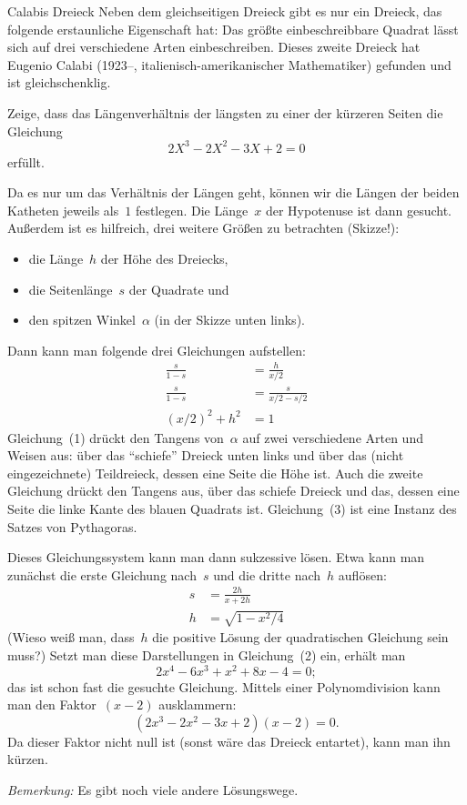 \documentclass{algblatt}
\begin{document}
\begin{aufgabe}{Calabis Dreieck}
Neben dem gleichseitigen Dreieck gibt es nur ein Dreieck, das folgende erstaunliche
Eigenschaft hat: Das größte 
einbeschreibbare Quadrat lässt sich auf drei verschiedene Arten einbeschreiben.
Dieses zweite Dreieck hat Eugenio Calabi (1923--, italienisch-amerikanischer
Mathematiker) gefunden und ist gleichschenklig.

Zeige, dass das Längenverhältnis der längsten zu einer der kürzeren Seiten die
Gleichung
\[ 2 X^3 - 2 X^2 - 3 X + 2 = 0 \]
erfüllt. \ifloesungen\else\\[1em]\fi

\begin{center}
  \scalebox{0.5}{}
\end{center}

\begin{loesung}\addtolength{\jot}{0.3em}%
Da es nur um das Verhältnis der Längen geht, können wir die Längen der
beiden Katheten jeweils als~$1$ festlegen. Die Länge~$x$ der Hypotenuse ist
dann gesucht. Außerdem ist es hilfreich, drei weitere Größen zu betrachten
(Skizze!):
\begin{itemize}
\item die Länge~$h$ der Höhe des Dreiecks,
\item die Seitenlänge~$s$ der Quadrate und
\item den spitzen Winkel~$\alpha$ (in der Skizze unten links).
\end{itemize}
Dann kann man folgende drei Gleichungen aufstellen:
\begin{align}
  \frac{s}{1 - s} &= \frac{h}{x/2} \\
  \frac{s}{1 - s} &= \frac{s}{x/2 - s/2} \\
  (x/2)^2 + h^2 &= 1
\end{align}
Gleichung~(1) drückt den Tangens von~$\alpha$ auf zwei verschiedene Arten und
Weisen aus: über das "`schiefe"' Dreieck unten links und über das (nicht
eingezeichnete) Teildreieck, dessen eine Seite die Höhe ist. Auch die zweite
Gleichung drückt den Tangens aus, über das schiefe Dreieck und das, dessen eine
Seite die linke Kante des blauen Quadrats ist. Gleichung~(3) ist eine Instanz
des Satzes von Pythagoras.

Dieses Gleichungssystem kann man dann sukzessive lösen. Etwa kann man zunächst
die erste Gleichung nach~$s$ und die dritte nach~$h$ auflösen:
\begin{align*}
  s &= \frac{2h}{x + 2h} \\
  h &= \sqrt{1 - x^2/4}
\end{align*}
(Wieso weiß man, dass~$h$ die positive Lösung der quadratischen Gleichung sein
muss?) Setzt man diese Darstellungen in Gleichung~(2) ein, erhält man
\[ 2x^4 - 6x^3 + x^2 + 8x - 4 = 0; \]
das ist schon fast die gesuchte Gleichung. Mittels einer Polynomdivision kann
man den Faktor~$(x-2)$ ausklammern:
\[ (2x^3 - 2x^2 - 3x + 2) (x-2) = 0. \]
Da dieser Faktor nicht null ist (sonst wäre das Dreieck entartet), kann man ihn
kürzen.

\emph{Bemerkung:} Es gibt noch viele andere Lösungswege.
\end{loesung}
\end{aufgabe}
\end{document}
